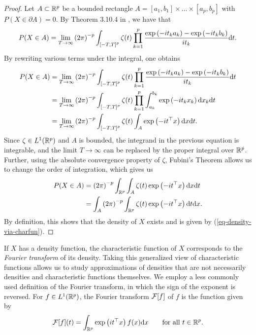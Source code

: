\begin{proof}
    Let $A \subset \Rp$ be a bounded rectangle $A = [a_1, b_1] \times \ldots \times [a_p, b_p]$ with $P(X \in \partial A) = 0$. By Theorem 3.10.4 in \cite{durrett_2019}, we have that
    \begin{equation*}
        P(X \in A) = \lim_{T \rightarrow \infty} \left(2\pi\right)^{-p}\int_{\left[-T, T\right]^p} \zeta(t) \prod_{k=1}^p \frac{\expf{-it_k a_k} - \expf{-it_k b_k}}{i t_k} \d t.
    \end{equation*}
    By rewriting various terms under the integral, one obtains
    \begin{align*}
        P(X \in A) 
        &= \lim_{T \rightarrow \infty} \left(2\pi\right)^{-p}\int_{\left[-T, T\right]^p} \zeta(t) \prod_{k=1}^p \frac{\expf{-it_k a_k} - \expf{-it_k b_k}}{i t_k} \d t \\
        &= \lim_{T \rightarrow \infty} \left(2\pi\right)^{-p}\int_{\left[-T, T\right]^p} \zeta(t) \prod_{k=1}^p \int_{a_k}^{b_k}\expf{-i t_k x_k} \d x_k \d t \\
        &= \lim_{T \rightarrow \infty} \left(2\pi\right)^{-p}\int_{\left[-T, T\right]^p} \zeta(t) \int_A \expf{-i t^\top x} \d x \d t.
    \end{align*}
    Since $\zeta \in L^1(\Rp)$ and $A$ is bounded, the integrand in the previous equation is integrable, and the limit $T \rightarrow \infty$ can be replaced by the proper integral over $\Rp$. Further, using the absolute convergence property of $\zeta$, Fubini's Theorem allows us to change the order of integration, which gives us
    \begin{align*}
        P(X \in A) 
        &= \left(2\pi\right)^{-p}\intRp{t}{\int_A \zeta(t) \expf{-i t^\top x} \d x} \\
        &= \int_A \left(2\pi\right)^{-p} \intRp{t}{\zeta(t) \expf{-i t^\top x} } \d x.
    \end{align*}
    By definition, this shows that the density of $X$ exists and is given by (\ref{eq-density-via-charfun}).
\end{proof}

If $X$ has a density function, the characteristic function of $X$ corresponds to the \textit{Fourier transform} of its density. Taking this generalized view of characteristic functions allows us to study approximations of densities that are not necessarily densities and characteristic functions themselves. We employ a less commonly used definition of the Fourier transform, in which the sign of the exponent is reversed. For $f \in L^1(\Rp)$, the Fourier transform $\F[f]$ of $f$ is the function given by
\begin{equation} \label{eq-fourier-density}
    \F[f](t) = \int_\Rp \expf{it^\top x}f(x)\d x \ \ \ \ \ \ \t{for all } t \in \Rp.
\end{equation}

